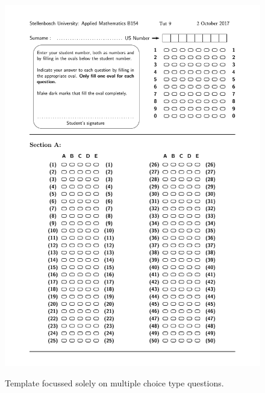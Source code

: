 \begin{figure}
  \centering
  \includegraphics[width=12cm]{template3}\\
  \caption{Template focussed solely on multiple choice type questions.}
  \label{fig:template3}
\end{figure}


